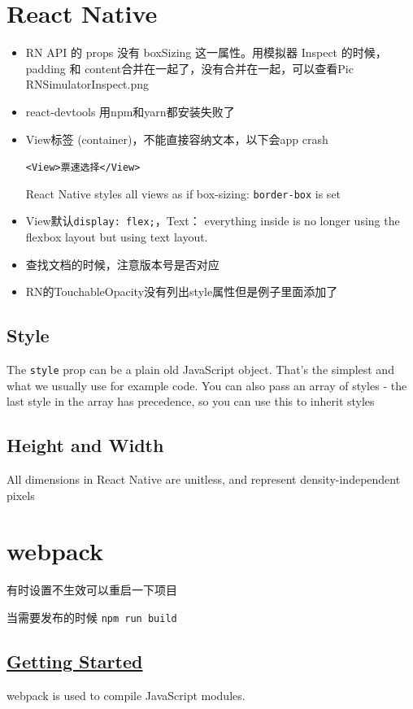 \documentclass[a4paper, 12pt]{article}
\begin{document}
\section{React Native}
\begin{itemize}
\item RN API 的 props 没有 boxSizing 这一属性。用模拟器 Inspect 的时候，padding 和 content合并在一起了，没有合并在一起，可以查看Pic RNSimulatorInspect.png

\item react-devtools 用npm和yarn都安装失败了

\item View标签 (container)，不能直接容纳文本，以下会app crash

\verb|<View>票速选择</View>|

React Native styles all views as if box-sizing: \verb|border-box| is set

\item View默认\verb|display: flex;|，Text： everything inside is no longer using the flexbox layout but using text layout.

\item 查找文档的时候，注意版本号是否对应

\item RN的TouchableOpacity没有列出style属性但是例子里面添加了
\end{itemize}

\subsection{Style}
The \verb|style| prop can be a plain old JavaScript object. That's the simplest and what we usually use for example code. You can also pass an array of styles - the last style in the array has precedence, so you can use this to inherit styles

\subsection{Height and Width}
All dimensions in React Native are unitless, and represent density-independent pixels


\section{webpack}
有时设置不生效可以重启一下项目

当需要发布的时候 \verb|npm run build|

\subsection{\href{https://webpack.js.org/guides/getting-started/}{Getting Started}}
webpack is used to compile JavaScript modules.
\end{document}

